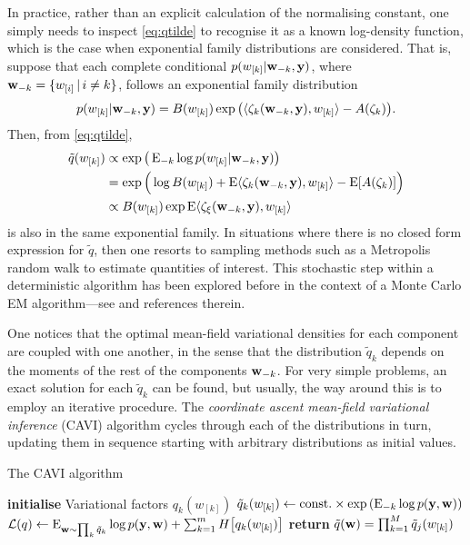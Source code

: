 In practice, rather than an explicit calculation of the normalising constant, one simply needs to inspect \cref{eq:qtilde} to recognise it as a known log-density function, which is the case when exponential family distributions are considered.
That is, suppose that each complete conditional $p(w_{[k]}|{\mathbf w}_{-k}, {\mathbf y})$, where ${\mathbf w}_{-k} = \{w_{[i]} \,|\, i \neq k\}$, follows an exponential family distribution
\[
  p(w_{[k]}| {\mathbf w}_{-k}, {\mathbf y} ) 
  = B(w_{[k]})\exp \big(\langle\zeta_k({\mathbf w}_{-k}, {\mathbf y}) , w_{[k]}\rangle - A(\zeta_k) \big).
\]
Then, from \cref{eq:qtilde},
\begin{align*}
  \tilde q(w_{[k]})
  &\propto \exp\big(\operatorname{E}_{-k}\log p(w_{[k]}| {\mathbf w}_{-k}, {\mathbf y}) \big) \\
  &= \exp \Big(\log B(w_{[k]}) + \operatorname{E} \langle\zeta_k({\mathbf w}_{-k}, {\mathbf y}) , w_{[k]}\rangle - \operatorname{E} [ A(\zeta_k) ] \Big) \\
  &\propto B(w_{[k]})\exp \operatorname{E}\langle\zeta_\xi({\mathbf w}_{-k}, {\mathbf y}) , w_{[k]}\rangle
\end{align*}
is also in the same exponential family.
In situations where there is no closed form expression for $\tilde q$, then one resorts to sampling methods such as a Metropolis random walk to estimate quantities of interest.
This stochastic step within a deterministic algorithm has been explored before in the context of a Monte Carlo EM algorithm---see \citet[sec. 4, pp. 537--538]{meng1997algorithm} and references therein.

One notices that the optimal mean-field variational densities for each component are coupled with one another, in the sense that the distribution $\tilde q_k$ depends on the moments of the rest of the components ${\mathbf w}_{-k}$.
For very simple problems, an exact solution for each $\tilde q_k$ can be found, but usually, the way around this is to employ an iterative procedure.
The \emph{coordinate ascent mean-field variational inference} (CAVI) algorithm cycles through each of the distributions in turn, updating them in sequence starting with arbitrary distributions as initial values.

\begin{algorithm}[H]
\caption{The CAVI algorithm}\label{alg:cavi}
  \begin{algorithmic}[1]
    \State \textbf{initialise} Variational factors $q_k(w_{[k]})$
        \State $\tilde q_k(w_{[k]}) \gets \text{const.}\hspace{0.01em} \times \exp \left( \operatorname{E}_{-k}\log p({\mathbf y},{\mathbf w}) \right)$ 
      \EndFor
      \State ${\mathcal L}(q) \gets \operatorname{E}_{{\mathbf w} \sim \prod_k\tilde q_k}\log p({\mathbf y}, {\mathbf w}) + \sum_{k=1}^m H\big[ q_k(w_{[k]})\big]$ 
    \EndWhile
    \State \textbf{return} $\tilde q({\mathbf w}) = \prod_{k=1}^M \tilde q_j(w_{[k]})$ 
  \end{algorithmic}
\end{algorithm}

